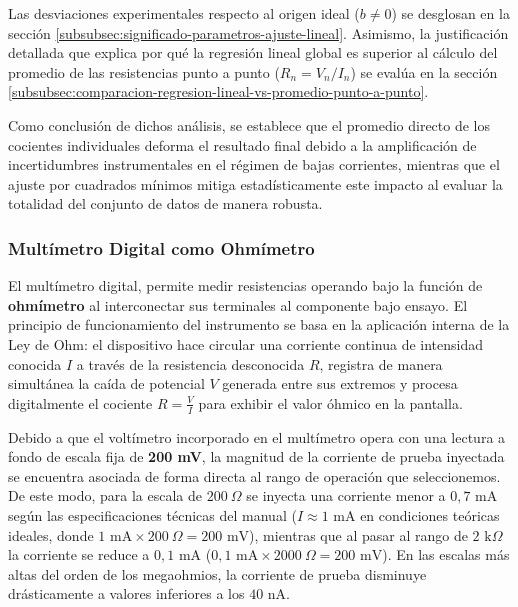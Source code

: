 Las desviaciones experimentales respecto al origen ideal ($b \neq 0$) se desglosan en la sección \ref{subsubsec:significado-parametros-ajuste-lineal}. Asimismo, la justificación detallada que explica por qué la regresión lineal global es superior al cálculo del promedio de las resistencias punto a punto ($R_n = V_n / I_n$) se evalúa en la sección \ref{subsubsec:comparacion-regresion-lineal-vs-promedio-punto-a-punto}.

Como conclusión de dichos análisis, se establece que el promedio directo de los cocientes individuales deforma el resultado final debido a la amplificación de incertidumbres instrumentales en el régimen de bajas corrientes, mientras que el ajuste por cuadrados mínimos mitiga estadísticamente este impacto al evaluar la totalidad del conjunto de datos de manera robusta.



\subsubsection{Multímetro Digital como Ohmímetro}

El multímetro digital, permite medir resistencias operando bajo la función de \textbf{ohmímetro} al interconectar sus terminales al componente bajo ensayo. El principio de funcionamiento del instrumento se basa en la aplicación interna de la Ley de Ohm: el dispositivo hace circular una corriente continua de intensidad conocida $I$ a través de la resistencia desconocida $R$, registra de manera simultánea la caída de potencial $V$ generada entre sus extremos y procesa digitalmente el cociente $R = \frac{V}{I}$ para exhibir el valor óhmico en la pantalla. 

Debido a que el voltímetro incorporado en el multímetro opera con una lectura a fondo de escala fija de \textbf{200 mV}, la magnitud de la corriente de prueba inyectada se encuentra asociada de forma directa al rango de operación que seleccionemos. De este modo, para la escala de $200\ \Omega$ se inyecta una corriente menor a $0{,}7\text{ mA}$ según las especificaciones técnicas del manual ($I \approx 1\text{ mA}$ en condiciones teóricas ideales, donde $1\text{ mA} \times 200\ \Omega = 200\text{ mV}$), mientras que al pasar al rango de $2\text{ k}\Omega$ la corriente se reduce a $0{,}1\text{ mA}$ ($0{,}1\text{ mA} \times 2000\ \Omega = 200\text{ mV}$). En las escalas más altas del orden de los megaohmios, la corriente de prueba disminuye drásticamente a valores inferiores a los $40\text{ nA}$.

